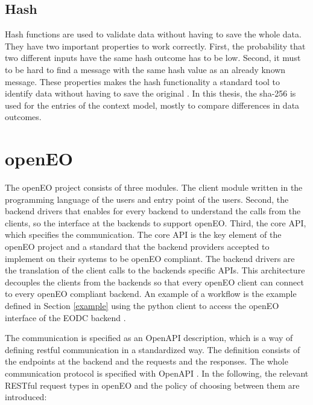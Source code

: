 \documentclass[draft,final]{vutinfth} %
\begin{document}
\subsection{Hash}\label{Hash}
Hash functions are used to validate data without having to save the whole data. They have two
important properties to work correctly. First, the probability that two different inputs have the same hash outcome has to be low. Second, it must to be hard to find a message with the same hash value as an already known message. These properties makes the hash functionality a standard tool to identify data without having to save the original \cite{3b412889270f46f59740fbf1ca8cd7e0}.  
In this thesis, the \gls{sha}-256 is used for the entries of the context model, mostly to compare differences in data outcomes.


\section{openEO}\label{openEO}
The openEO project consists of three modules. The client module written in the programming language of the users and entry point of the users. Second, the backend drivers that enables for every backend to understand the calls from the clients, so the interface at the backends to support openEO. Third, the core API, which specifies the communication. The core API is the key element of the openEO project and a standard that the backend providers accepted to implement on their systems to be openEO compliant. The backend drivers are the translation of the client calls to the backends specific APIs. This architecture decouples the clients from the backends so that every openEO client can connect to every openEO compliant backend. An example of a workflow is the example defined in Section \ref{example} using the python client to access the openEO interface of the EODC backend \cite{openeo}. 

The communication is specified as an OpenAPI description, which is a way of defining \gls{rest}ful communication in a standardized way. The definition consists of the endpoints at the backend and the requests and the responses. The whole communication protocol is specified with OpenAPI \cite{openapi}. 
In the following, the relevant RESTful request types in openEO and the policy of choosing between them are introduced:
\end{document}
